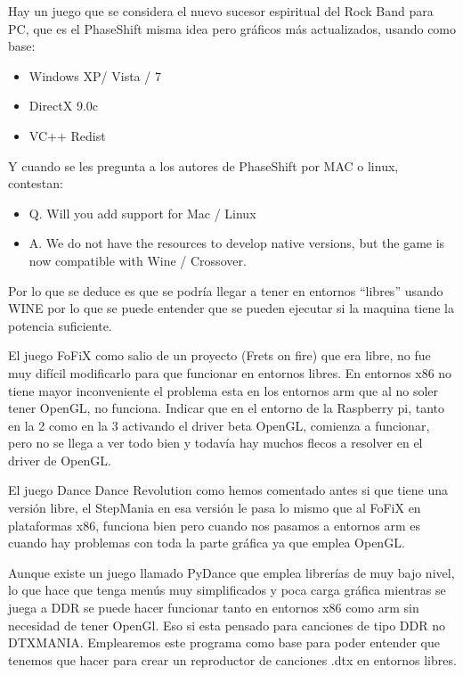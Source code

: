 \documentclass[a4paper,11pt,oneside]{book}
\begin{document}
Hay un juego que se considera el nuevo sucesor espiritual del \gls{Rock Band} para PC, que es el PhaseShift misma idea pero gráficos más actualizados, usando como base:

\begin{itemize}
  \item Windows XP/ Vista / 7
  \item DirectX 9.0c
  \item VC++ Redist
\end{itemize}

Y cuando se les pregunta a los autores de PhaseShift por MAC o linux, contestan:
\begin{itemize}
  \item Q. Will you add support for Mac / Linux
  \item A. We do not have the resources to develop native versions, but the game is now compatible with Wine / Crossover.
\end{itemize}

Por lo que se deduce es que se podría llegar a tener en entornos ``libres'' usando WINE por lo que se puede entender que se pueden ejecutar si la maquina tiene la potencia suficiente.

El juego FoFiX como salio de un proyecto (Frets on fire) que era libre, no fue muy difícil modificarlo para que funcionar en entornos libres.
En entornos x86 no tiene mayor inconveniente el problema esta en los entornos arm que al no soler tener OpenGL, no funciona. Indicar que en el entorno de la Raspberry pi, tanto en la 2 como en la 3 activando el driver beta OpenGL, comienza a funcionar, pero no se llega a ver todo bien y todavía hay muchos flecos a resolver en el driver de OpenGL.


El juego Dance Dance Revolution como hemos comentado antes si que tiene una versión libre, el StepMania en esa versión le pasa lo mismo que al FoFiX en plataformas x86, funciona bien pero cuando nos pasamos a entornos arm es cuando hay problemas con toda la parte gráfica ya que emplea OpenGL.

Aunque existe un juego llamado PyDance que emplea librerías de muy bajo nivel, lo que hace que tenga menús muy simplificados y poca carga gráfica mientras se juega a DDR se puede hacer funcionar tanto en entornos x86 como arm sin necesidad de tener OpenGl. Eso si esta pensado para canciones de tipo DDR no DTXMANIA.  Emplearemos este programa como base para poder entender que tenemos que hacer para crear un reproductor de canciones .dtx en entornos libres.
\end{document}
